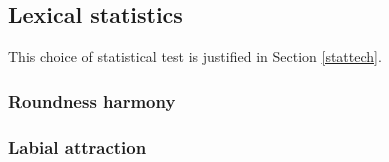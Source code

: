 \subsection{Lexical statistics}

This choice of statistical test is justified in Section \ref{stattech}.

\subsubsection{Roundness harmony}



\subsubsection{Labial attraction}


